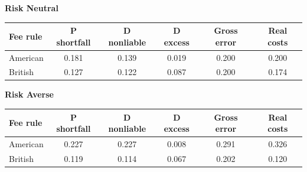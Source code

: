 \documentclass[10pt,border=5pt,varwidth=17cm]{standalone}
\begin{document}
\begingroup
\small
\setlength{\tabcolsep}{5pt}
\renewcommand{\arraystretch}{1.20}
\noindent\textbf{Risk Neutral}\par\smallskip
\noindent\begin{tabularx}{\linewidth}{@{}>{\raggedright\arraybackslash}Xccccc@{}}
\toprule
\textbf{Fee rule} & \textbf{P shortfall} & \textbf{D nonliable} & \textbf{D excess} & \textbf{Gross error} & \textbf{Real costs} \\
\midrule
American & 0.181 & 0.139 & 0.019 & 0.200 & 0.200 \\
British & 0.127 & 0.122 & 0.087 & 0.200 & 0.174 \\
\bottomrule\end{tabularx}\par\medskip
\noindent\textbf{Risk Averse}\par\smallskip
\noindent\begin{tabularx}{\linewidth}{@{}>{\raggedright\arraybackslash}Xccccc@{}}
\toprule
\textbf{Fee rule} & \textbf{P shortfall} & \textbf{D nonliable} & \textbf{D excess} & \textbf{Gross error} & \textbf{Real costs} \\
\midrule
American & 0.227 & 0.227 & 0.008 & 0.291 & 0.326 \\
British & 0.119 & 0.114 & 0.067 & 0.202 & 0.120 \\
\bottomrule\end{tabularx}\par\medskip
\endgroup
\end{document}
